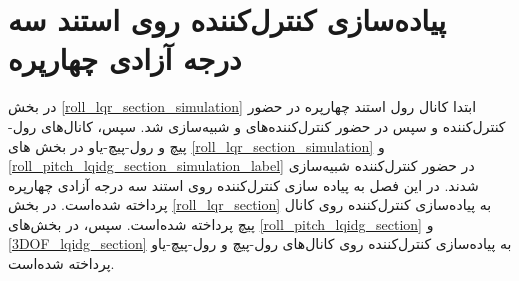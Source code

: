 \chapter{پیاده‌سازی کنترل‌کننده روی استند سه درجه آزادی چهارپره}

 در بخش
\ref{roll_lqr_section_simulation}
ابتدا کانال رول استند چهارپره در حضور کنترل‌کننده  و سپس در حضور کنترل‌کننده‌های  و  شبیه‌سازی شد. سپس، کانال‌های رول-پیچ و رول-پیچ-یاو در بخش های
\ref{roll_lqr_section_simulation}
و
\ref{roll_pitch_lqidg_section_simulation_label}
در حضور کنترل‌کننده   شبیه‌سازی شدند. 
در این فصل به پیاده سازی کنترل‌کننده روی استند سه درجه آزادی چهارپره پرداخته شده‌است. در بخش 
\ref{roll_lqr_section}
به پیاده‌سازی کنترل‌کننده روی کانال پیچ پرداخته شده‌است. سپس، در بخش‌های 
\ref{roll_pitch_lqidg_section}
و
\ref{3DOF_lqidg_section}
به پیاده‌سازی کنترل‌کننده روی کانال‌های رول-پیچ و رول-پیچ-یاو پرداخته شده‌است. 
